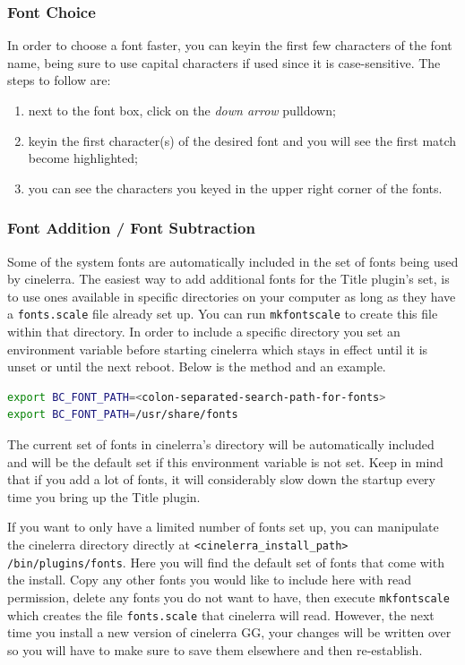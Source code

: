 \subsubsection*{Font Choice}%
\label{ssub:font_choice}

In order to choose a font faster, you can keyin the first few characters of the font name, being sure to use capital characters if used since it is case-sensitive. The steps to follow are:

\begin{enumerate}
    \item next to the font box, click on the \textit{down arrow} pulldown;
    \item keyin the first character(s) of the desired font and you will see the first match become highlighted;
    \item you can see the characters you keyed in the upper right corner of the fonts.
\end{enumerate}

\subsubsection*{Font Addition / Font Subtraction}%
\label{ssub:font_addition_subtraction}

Some of the system fonts are automatically included in the set of fonts being used by cinelerra. The easiest way to add additional fonts for the Title plugin's set, is to use ones available in specific directories on your computer as long as they have a \texttt{fonts.scale} file already set up. You can run \texttt{mkfontscale} to create this file within that directory. In order to include a specific directory you set an environment variable before starting cinelerra which stays in effect until it is unset or until the next reboot. Below is the method and an example.

\vspace{1ex}
\begin{lstlisting}[language=bash]
export BC_FONT_PATH=<colon-separated-search-path-for-fonts>
export BC_FONT_PATH=/usr/share/fonts
\end{lstlisting}

The current set of fonts in cinelerra's directory will be automatically included and will be the default set if this environment variable is not set. Keep in mind that if you add a lot of fonts, it will considerably slow down the startup every time you bring up the Title plugin. 

If you want to only have a limited number of fonts set up, you can manipulate the cinelerra directory directly at \texttt{<cinelerra\_install\_path> /bin/plugins/fonts}. Here you will find the default set of fonts that come with the install. Copy any other fonts you would like to include here with read permission, delete any fonts you do not want to have, then execute \texttt{mkfontscale} which creates the file \texttt{fonts.scale} that cinelerra will read. However, the next time you install a new version of cinelerra GG, your changes will be written over so you will have to make sure to save them elsewhere and then re-establish. 

